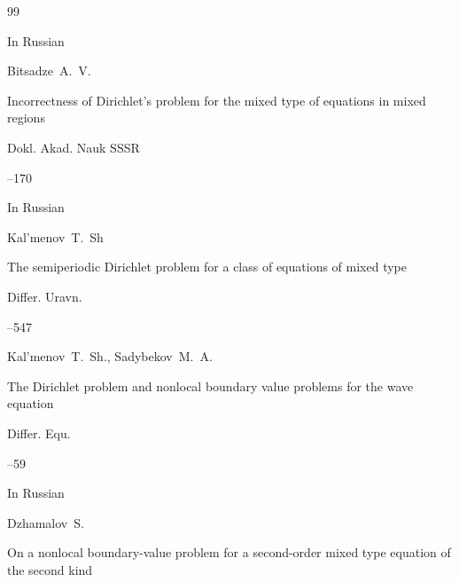 \begin{thebibliography}{99}




\lang In Russian

\by Bitsadze~A.~V.

\paper Incorrectness of Dirichlet's problem for the mixed type of equations in mixed regions

\jour Dokl. Akad. Nauk SSSR




--170






\lang In Russian

\by Kal'menov~T.~Sh

\paper The semiperiodic Dirichlet problem for a class of equations of mixed type

\jour Differ. Uravn.




--547






\by Kal'menov~T.~Sh., Sadybekov~M.~A.

\paper  The Dirichlet problem and nonlocal boundary value problems for the wave equation


\jour Differ. Equ.




--59












\lang In Russian

\by Dzhamalov~S.

\paper  On a nonlocal boundary-value problem for a second-order mixed type equation of the second kind


\end{thebibliography}
